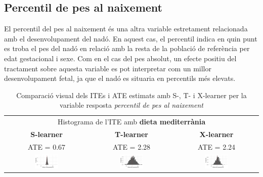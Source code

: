 \documentclass[../main.tex]{subfiles}
\begin{document}


    \FloatBarrier
    \subsection{Percentil de pes al naixement}\label{subsec:percentil}
    El percentil del pes al naixement és una altra variable estretament relacionada amb el desenvolupament del nadó. En aquest cas, el percentil indica en quin punt es troba el pes del nadó en relació amb la resta de la població de referència per edat gestacional i sexe. Com en el cas del pes absolut, un efecte positiu del tractament sobre aquesta variable es pot interpretar com un millor desenvolupament fetal, ja que el nadó es situaria en percentils més elevats.

    
    \begin{table}[H]
        \centering
        \begin{tabular}{ccc}
        \multicolumn{3}{c}{Histograma de l'ITE amb \textbf{dieta mediterrània}} \\
        \small \textbf{S-learner} & \small \textbf{T-learner} & \small \textbf{X-learner} \\
        \footnotesize ATE = 0.67 & \footnotesize ATE = 2.28 & \footnotesize ATE = 2.24 \\
        \includegraphics[width=0.3\textwidth]{imgs/histogrames/hist(percentil_birth)S_tract2.jpg} &
        \includegraphics[width=0.3\textwidth]{imgs/histogrames/hist(percentil_birth)T_tract2.jpg} &
        \includegraphics[width=0.3\textwidth]{imgs/histogrames/hist(percentil_birth)X_tract2.jpg} \\
        \end{tabular}
        \footnotesize \caption{\footnotesize Comparació visual dels ITEs i ATE estimats amb S-, T- i X-learner per la variable resposta \textit{percentil de pes al naixement}}
        \label{tab:histITE_percentil2}
    \end{table}
\end{document}

